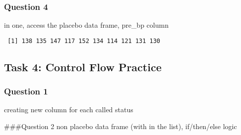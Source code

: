 \documentclass[
  letterpaper,
  DIV=11,
  numbers=noendperiod]{scrartcl}
\newenvironment{Shaded}{\begin{snugshade}}{\end{snugshade}}
\newcommand{\CommentTok}[1]{\textcolor[rgb]{0.37,0.37,0.37}{#1}}
\newcommand{\DecValTok}[1]{\textcolor[rgb]{0.68,0.00,0.00}{#1}}
\newcommand{\FunctionTok}[1]{\textcolor[rgb]{0.28,0.35,0.67}{#1}}
\newcommand{\NormalTok}[1]{\textcolor[rgb]{0.00,0.23,0.31}{#1}}
\newcommand{\OtherTok}[1]{\textcolor[rgb]{0.00,0.23,0.31}{#1}}
\newcommand{\SpecialCharTok}[1]{\textcolor[rgb]{0.37,0.37,0.37}{#1}}
\begin{document}
\subsubsection{Question 4}\label{question-4-2}

in one, access the placebo data frame, pre\_bp column

\begin{Shaded}
\end{Shaded}

\begin{verbatim}
 [1] 138 135 147 117 152 134 114 121 131 130
\end{verbatim}

\subsection{Task 4: Control Flow
Practice}\label{task-4-control-flow-practice}

\subsubsection{Question 1}\label{question-1-2}

creating new column for each called status

\begin{Shaded}
\end{Shaded}

\#\#\#Question 2 non placebo data frame (with in the list), if/then/else
logic
\end{document}
